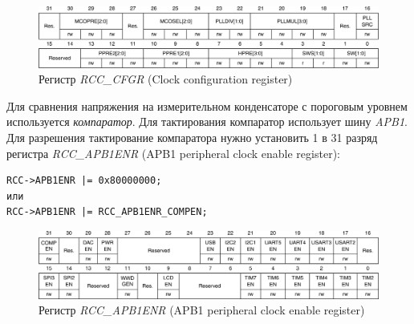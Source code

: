 \begin{figure}[H]
\begin{center}
\includegraphics[scale=0.25]{Image/75.jpg} 
\end{center}
\caption{Регистр \textit{RCC\_CFGR} (Clock configuration register)}
\end{figure}
Для сравнения напряжения на измерительном конденсаторе с пороговым уровнем используется \textit{компаратор}. Для тактирования компаратор использует шину \textit{APB1}. Для разрешения тактирование компаратора нужно установить 1 в 31 разряд регистра \textit{RCC\_APB1ENR} (APB1 peripheral clock enable register):
\begin{verbatim}
RCC->APB1ENR |= 0x80000000;
или
RCC->APB1ENR |= RCC_APB1ENR_COMPEN;
\end{verbatim}

\begin{figure}[H]
\begin{center}
\includegraphics[scale=0.25]{Image/76.jpg} 
\end{center}
\caption{Регистр \textit{RCC\_APB1ENR} (APB1 peripheral clock enable register)}
\end{figure}